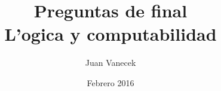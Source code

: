 \documentclass{exam}
\begin{document}
\title{Preguntas de final \\  L'ogica y computabilidad}
\author{Juan Vanecek}
\date{Febrero 2016}
\begin{titlepage}
 \maketitle
\end{titlepage}




\newpage


\end{document}

